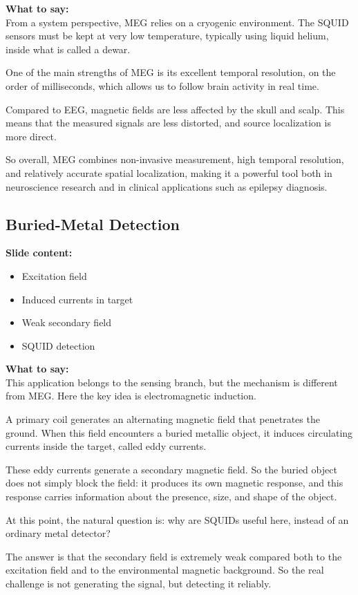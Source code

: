 \documentclass[11pt,a4paper]{article}
\newcommand{\points}[1]{{\color{accent}\textbf{Slide content:}}\\#1}
\newcommand{\speech}[1]{{\color{accent}\textbf{What to say:}}\\#1}
\begin{document}
\speech{
From a system perspective, MEG relies on a cryogenic environment. The SQUID sensors must be kept at very low temperature, typically using liquid helium, inside what is called a dewar.

One of the main strengths of MEG is its excellent temporal resolution, on the order of milliseconds, which allows us to follow brain activity in real time.

Compared to EEG, magnetic fields are less affected by the skull and scalp. This means that the measured signals are less distorted, and source localization is more direct.

So overall, MEG combines non-invasive measurement, high temporal resolution, and relatively accurate spatial localization, making it a powerful tool both in neuroscience research and in clinical applications such as epilepsy diagnosis.
}


\subsection{Buried-Metal Detection}

\points{
\begin{itemize}
\item Excitation field
\item Induced currents in target
\item Weak secondary field
\item SQUID detection
\end{itemize}
}

\speech{
This application belongs to the sensing branch, but the mechanism is different from MEG. Here the key idea is electromagnetic induction.

A primary coil generates an alternating magnetic field that penetrates the ground. When this field encounters a buried metallic object, it induces circulating currents inside the target, called eddy currents.

These eddy currents generate a secondary magnetic field. So the buried object does not simply block the field: it produces its own magnetic response, and this response carries information about the presence, size, and shape of the object.

At this point, the natural question is: why are SQUIDs useful here, instead of an ordinary metal detector?

The answer is that the secondary field is extremely weak compared both to the excitation field and to the environmental magnetic background. So the real challenge is not generating the signal, but detecting it reliably.
}
\end{document}
